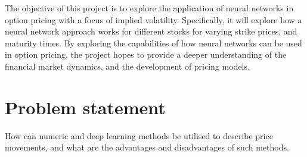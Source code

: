 The objective of this project is to explore the application of neural networks in option pricing with a focus of implied volatility. Specifically, it will explore how a neural network approach works for different stocks for varying strike prices, and maturity times. By exploring the capabilities of how neural networks can be used in option pricing, the project hopes to provide a deeper understanding of the financial market dynamics, and the development of pricing models. 


\section{Problem statement}\label{Sec.Problem_statement}
How can numeric and deep learning methods be utilised to describe price movements, and what are the advantages and disadvantages of such methods.